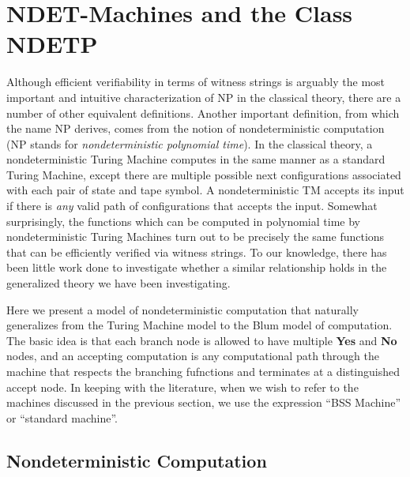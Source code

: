 \chapter{NDET-Machines and the Class NDETP}
\label{chap:ndet}


Although efficient verifiability in terms of witness strings is
arguably the most important and intuitive characterization of NP in
the classical theory, there are a number of other equivalent
definitions.  Another important definition, from which the name NP
derives, comes from the notion of nondeterministic computation (NP
stands for \emph{nondeterministic polynomial time}).  In the classical
theory, a nondeterministic Turing Machine computes in the same manner
as a standard Turing Machine, except there are multiple possible next
configurations associated with each pair of state and tape symbol.  A
nondeterministic TM accepts its input if there is \emph{any} valid
path of configurations that accepts the input.  Somewhat surprisingly,
the functions which can be computed in polynomial time by
nondeterministic Turing Machines turn out to be precisely the same
functions that can be efficiently verified via witness strings.  To
our knowledge, there has been little work done to investigate whether
a similar relationship holds in the generalized theory we have been
investigating.

Here we present a model of nondeterministic computation that naturally
generalizes from the Turing Machine model to the Blum model of
computation.  The basic idea is that each branch node is allowed to
have multiple \textbf{Yes} and \textbf{No} nodes, and an accepting
computation is any computational path through the machine that
respects the branching fufnctions and terminates at a distinguished
accept node.  In keeping with the literature, when we wish to refer to
the machines discussed in the previous section, we use the expression
``BSS Machine'' or ``standard machine''.


\section{Nondeterministic Computation}

